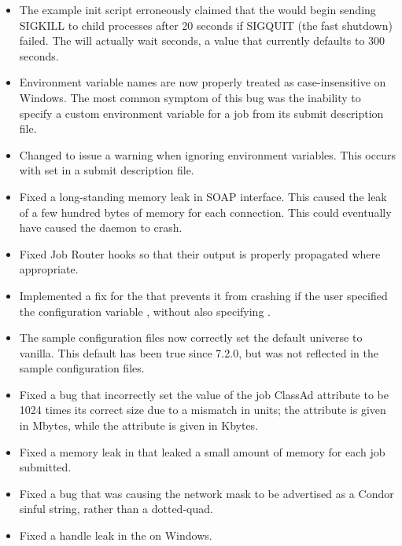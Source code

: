 \begin{itemize}
\item The example init script  erroneously claimed
that the  would begin sending SIGKILL to child
processes after 20 seconds if SIGQUIT (the fast shutdown) failed.  The
 will actually wait 
seconds, a value that currently defaults to 300 seconds.

\item Environment variable names are now properly treated as
case-insensitive on Windows. The most common symptom of this bug was
the inability to specify a custom  environment variable
for a job from its submit description file.

\item Changed   to issue a warning when ignoring
environment variables. This occurs with  set
in a submit description file.

\item Fixed a long-standing memory leak in SOAP interface.
This caused the leak of a few hundred bytes of memory for each connection.
This could eventually have caused the  daemon to crash.

\item Fixed Job Router hooks so that their output is properly
propagated where appropriate.

\item Implemented a fix for the  that prevents it from
crashing if the user specified the configuration variable
, without also specifying .

\item The sample configuration files now correctly set the default
universe to vanilla.  This default has been true since 7.2.0,
but was not reflected in the sample configuration files.

\item Fixed a bug that incorrectly set the value of the
job ClassAd attribute  to be 1024 times its
correct size due to a mismatch in units;
the attribute  is given in Mbytes, while
the attribute  is given in Kbytes.

\item Fixed a memory leak in  that leaked a small
amount of memory for each job submitted.

\item Fixed a bug that was causing the network mask to be advertised
as a Condor sinful string, rather than a dotted-quad.

\item Fixed a handle leak in the  on Windows.

\end{itemize}

